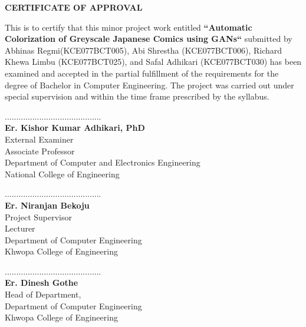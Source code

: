 \begin{center}
	\large{\textbf{CERTIFICATE OF APPROVAL}}
\end{center}
\vspace{1cm}
This is to certify that this minor project work entitled \textbf{``Automatic Colorization of Greyscale Japanese Comics using GANs``} submitted by Abhinas Regmi(KCE077BCT005), Abi Shrestha (KCE077BCT006), Richard Khewa Limbu (KCE077BCT025), and Safal Adhikari (KCE077BCT030) has been examined and accepted in the partial fulfillment of the requirements for the degree of Bachelor in Computer Engineering. The project was carried out under special supervision and within the time frame prescribed by the
syllabus.\\
\vspace{1in}
\begin{multicols}{2}
	\begin{center}
		..........................................\\
            \textbf{Er. Kishor Kumar Adhikari, PhD}\\
            External Examiner\\
            Associate Professor  \\
            Department of Computer and Electronics Engineering\\
            National College of Engineering
                    
                  \end{center}
                
                \columnbreak
                  \begin{center}
                    ..........................................\\
                    \textbf{Er. Niranjan Bekoju}\\
                    Project Supervisor\\
                      Lecturer\\
                            Department of Computer Engineering\\
                    Khwopa College of Engineering\\
                    
                  \end{center}
                \end{multicols}
                \vspace{1in}
                \begin{center}
                  ..........................................\\
                  \textbf{Er. Dinesh Gothe}\\
                  Head of Department,\\
                  Department of Computer Engineering\\
                  Khwopa College of Engineering
                \end{center}
                \pagebreak



